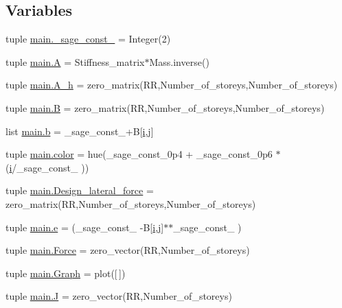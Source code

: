 \subsection*{Variables}
\begin{DoxyCompactItemize}
\item 
tuple \hyperlink{a00039_ad85d7913c0e40b9e1f30e64611a0fafa}{main.\+\_\+sage\+\_\+const\+\_} = Integer(2)
\item 
tuple \hyperlink{a00039_ad101f166a53497f04b37636bcadbfe65}{main.\+A} = Stiffness\+\_\+matrix$\ast$Mass.\+inverse()
\item 
tuple \hyperlink{a00039_a90e3156cc1a3ea63ba2d089e78b34e3d}{main.\+A\+\_\+h} = zero\+\_\+matrix(R\+R,Number\+\_\+of\+\_\+storeys,Number\+\_\+of\+\_\+storeys)
\item 
tuple \hyperlink{a00039_a6ae8768d11174f5baf9febc5244d6f06}{main.\+B} = zero\+\_\+matrix(R\+R,Number\+\_\+of\+\_\+storeys,Number\+\_\+of\+\_\+storeys)
\item 
list \hyperlink{a00039_ab1e783015bffd2e1d395a9099143d967}{main.\+b} = \+\_\+sage\+\_\+const\+\_+B\mbox{[}\hyperlink{a00008_a6dbbc96f4222af2f6c18c8e60f41726b}{i},\hyperlink{a00008_ac86694252f8dfdb19aaeadc4b7c342c6}{j}\mbox{]}
\item 
tuple \hyperlink{a00039_aeabbf69db1809807f065c2d1e9a62567}{main.\+color} = hue(\+\_\+sage\+\_\+const\+\_\+0p4 + \+\_\+sage\+\_\+const\+\_\+0p6 $\ast$(\hyperlink{a00008_a6dbbc96f4222af2f6c18c8e60f41726b}{i}/\+\_\+sage\+\_\+const\+\_ ))
\item 
tuple \hyperlink{a00039_a35df7d294c439792977f174dd5b04ec1}{main.\+Design\+\_\+lateral\+\_\+force} = zero\+\_\+matrix(R\+R,Number\+\_\+of\+\_\+storeys,Number\+\_\+of\+\_\+storeys)
\item 
tuple \hyperlink{a00039_aa7f4fe671f919f7f067f9337ef9e02c0}{main.\+e} = (\+\_\+sage\+\_\+const\+\_ -\/B\mbox{[}\hyperlink{a00008_a6dbbc96f4222af2f6c18c8e60f41726b}{i},\hyperlink{a00008_ac86694252f8dfdb19aaeadc4b7c342c6}{j}\mbox{]}$\ast$$\ast$\+\_\+sage\+\_\+const\+\_ )
\item 
tuple \hyperlink{a00039_a4612305e50326c88dea04736a647c238}{main.\+Force} = zero\+\_\+vector(R\+R,Number\+\_\+of\+\_\+storeys)
\item 
tuple \hyperlink{a00039_ad40f6b3437e83a0385177ac65a317b97}{main.\+Graph} = plot(\mbox{[}$\,$\mbox{]})
\item 
tuple \hyperlink{a00039_a00488f5887e168f7781b6fb94dd08518}{main.\+J} = zero\+\_\+vector(R\+R,Number\+\_\+of\+\_\+storeys)
\item 
$$
\end{DoxyCompactItemize}
